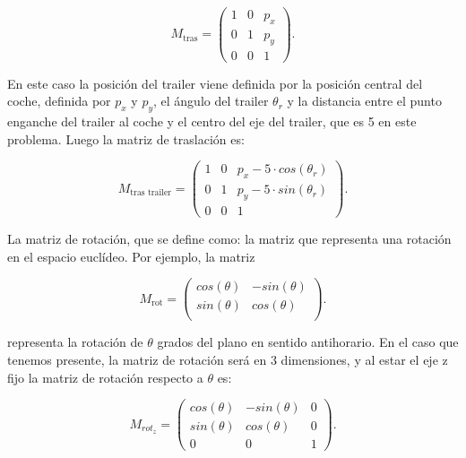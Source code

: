 \documentclass{article}
\begin{document}
\begin{scriptsize}
	\begin{equation*}
		M_{\text{tras}} =
		\begin{pmatrix}
			1 & 0  &p_x\\
			0 &1 &p_y\\
			0 &0 &1
		\end{pmatrix}.
	\end{equation*}
\end{scriptsize}
\newline
En este caso la posición del trailer viene definida por la posición central del coche, definida por $p_x$ y $p_y$, el ángulo del trailer $\theta_r$ y la distancia entre el punto enganche del trailer al coche y el centro del eje del trailer, que es 5 en este problema. Luego la matriz de traslación es:\\
\begin{scriptsize}
	\begin{equation*}
		M_{\text{tras trailer}} =
		\begin{pmatrix}
			1 & 0  &p_x - 5·cos(\theta_r) \\
			0 &1 &p_y - 5·sin(\theta_r)\\
			0 &0 &1
		\end{pmatrix}.
	\end{equation*}
\end{scriptsize}
\newline
La matriz de rotación, que se define como: la matriz que representa una rotación en el espacio euclídeo. Por ejemplo, la matriz
\begin{scriptsize}
	\begin{equation*}
		M_{\text{rot}} =
		\begin{pmatrix}
				cos(\theta) & -sin(\theta)\\
				sin(\theta) &cos(\theta)\\
		\end{pmatrix}.
	\end{equation*}
\end{scriptsize}
representa la rotación de $\theta$ grados del plano en sentido antihorario. En el caso que tenemos presente, la matriz de rotación será en 3 dimensiones, y al estar el eje z fijo la matriz de rotación respecto a $\theta$ es:
\begin{scriptsize}
	\begin{equation*}
		M_{\text{$rot_z$}} =
		\begin{pmatrix}
			cos(\theta) & -sin(\theta)  &0 \\
			sin(\theta) &cos(\theta) &0\\
			0 &0 &1
		\end{pmatrix}.
	\end{equation*}
\end{scriptsize}
\end{document}
